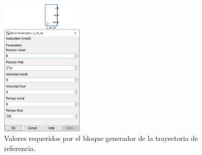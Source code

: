 \begin{figure}[H]
	\centering
	\includegraphics[width=4cm]{imagenes/control4}
	\caption{Valores requeridos por el bloque generador de la trayectoria de referencia.}
	\label{fig:control4}
\end{figure}

